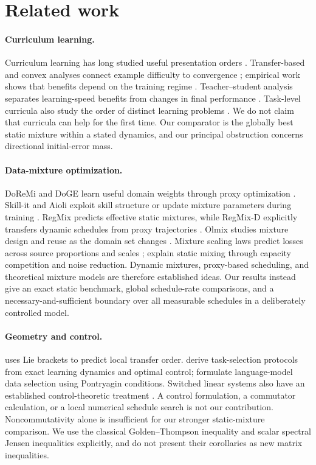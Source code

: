 \section{Related work}
\paragraph{Curriculum learning.}
Curriculum learning has long studied useful presentation orders \citep{bengio2009}. Transfer-based and convex analyses connect example difficulty to convergence \citep{weinshall2018,weinshall2020}; empirical work shows that benefits depend on the training regime \citep{hacohen2019,wu2021}. Teacher--student analysis separates learning-speed benefits from changes in final performance \citep{saglietti2022}. Task-level curricula also study the order of distinct learning problems \citep{pentina2015}. We do not claim that curricula can help for the first time. Our comparator is the globally best static mixture within a stated dynamics, and our principal obstruction concerns directional initial-error mass.

\paragraph{Data-mixture optimization.}
DoReMi and DoGE learn useful domain weights through proxy optimization \citep{xie2023,fan2024}. Skill-it and Aioli exploit skill structure or update mixture parameters during training \citep{chen2023,chen2025}. RegMix predicts effective static mixtures, while RegMix-D explicitly transfers dynamic schedules from proxy trajectories \citep{liu2025,zhao2026}. Olmix studies mixture design and reuse as the domain set changes \citep{chen2026}. Mixture scaling laws predict losses across source proportions and scales \citep{ye2025,shukor2025}; \citet{dai2026} explain static mixing through capacity competition and noise reduction. Dynamic mixtures, proxy-based scheduling, and theoretical mixture models are therefore established ideas. Our results instead give an exact static benchmark, global schedule-rate comparisons, and a necessary-and-sufficient boundary over all measurable schedules in a deliberately controlled model.

\paragraph{Geometry and control.}
\citet{sweeney2026} uses Lie brackets to predict local transfer order. \citet{mori2025} derive task-selection protocols from exact learning dynamics and optimal control; \citet{gu2025} formulate language-model data selection using Pontryagin conditions. Switched linear systems also have an established control-theoretic treatment \citep{liberzon2003}. A control formulation, a commutator calculation, or a local numerical schedule search is not our contribution. Noncommutativity alone is insufficient for our stronger static-mixture comparison. We use the classical Golden--Thompson inequality \citep{golden1965,thompson1965} and scalar spectral Jensen inequalities explicitly, and do not present their corollaries as new matrix inequalities.


